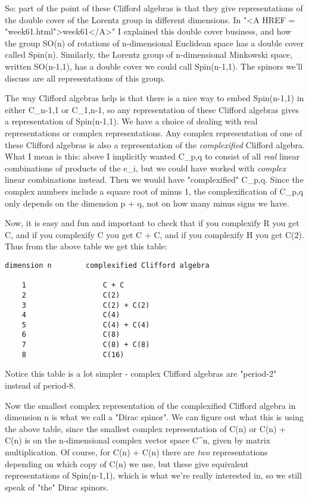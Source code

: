 So: part of the point of these Clifford algebras is that they give 
representations of the double cover of the Lorentz group in different
dimensions.  In "<A HREF = "week61.html">week61</A>" I explained this double cover business,
and how the group SO(n) of rotations of n-dimensional Euclidean space 
has a double cover called Spin(n).  Similarly, the Lorentz group
of n-dimensional Minkowski space, written SO(n-1,1), has a double cover 
we could call Spin(n-1,1).  The spinors we'll discuss are all 
representations of this group.  

The way Clifford algebras help is that there is a nice way to
embed Spin(n-1,1) in either C_{n-1,1} or C_{1,n-1}, so any 
representation of these Clifford algebras gives a representation
of Spin(n-1,1).   We have a choice of dealing with real representations or 
complex representations.  Any complex representation of one of
these Clifford algebras is also a representation of the \emph{complexified} 
Clifford algebra.   What I mean is this: above I implicitly wanted
C_{p,q} to consist of all \emph{real} linear combinations of products of 
the e_{i}, but we could have worked with \emph{complex} linear combinations 
instead.  Then we would have "complexified" C_{p,q}.  
Since the
complex numbers include a square root of minus 1, the complexification
of C_{p,q} only depends on the dimension p + q, not on how many minus 
signs we have. 

Now, it is easy and fun and important to check that if you complexify R 
you get C, and if you complexify C you get C + C, and if you complexify 
H you get C(2).  Thus from the above table we get this table: 

\begin{verbatim}
dimension n        complexified Clifford algebra

    1                  C + C
    2                  C(2)
    3                  C(2) + C(2)
    4                  C(4)
    5                  C(4) + C(4)
    6                  C(8)
    7                  C(8) + C(8)
    8                  C(16)

\end{verbatim}
    
Notice this table is a lot simpler - complex Clifford algebras
are "period-2" instead of period-8.  

Now the smallest complex representation of the complexified Clifford
algebra in dimension n is what we call a "Dirac spinor".  We can figure
out what this is using the above table, since the smallest complex 
representation of C(n) or C(n) + C(n) is on the n-dimensional complex
vector space C^{n}, given by matrix multiplication.  Of course, for 
C(n) + C(n) there are \emph{two} representations depending on which copy 
of C(n) we use, but these give equivalent representations of Spin(n-1,1), 
which is what we're really interested in, so we still speak of "the" 
Dirac spinors.

